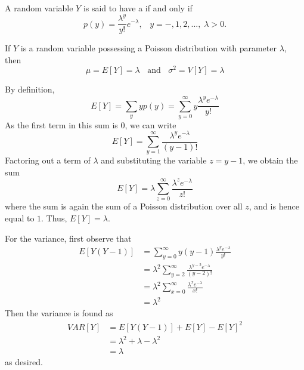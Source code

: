 \documentclass[12pt, a4paper, twoside, openright, titlepage]{book}
\begin{document}
\begin{defn}{}{}
    A random variable $Y$ is said to have a  if and only if \begin{equation*}
        p(y) = \frac{\lambda^y}{y!}e^{-\lambda},\;\;\; y = -,1,2,...,\;\lambda > 0.
    \end{equation*}
\end{defn}


\begin{thm}{}{}
    If $Y$ is a random variable possessing a Poisson distribution with parameter $\lambda$, then \begin{equation*}
        \mu = E[Y] = \lambda\;\;\text{ and }\;\;\sigma^2 = V[Y] = \lambda
    \end{equation*}
\end{thm}
\begin{proof*}{}{}
    By definition, \begin{equation*}
        E[Y] = \sum_yyp(y) = \sum\limits_{y=0}^{\infty}y\frac{\lambda^ye^{-\lambda}}{y!}
    \end{equation*}
    As the first term in this sum is $0$, we can write \begin{equation*}
        E[Y] = \sum\limits_{y=1}^{\infty}\frac{\lambda^ye^{-\lambda}}{(y-1)!}
    \end{equation*}
    Factoring out a term of $\lambda$ and substituting the variable $z = y-1$, we obtain the sum \begin{equation*}
        E[Y] = \lambda\sum\limits_{z=0}^{\infty}\frac{\lambda^ze^{-\lambda}}{z!}
    \end{equation*}
    where the sum is again the sum of a Poisson distribution over all $z$, and is hence equal to $1$. Thus, $E[Y] = \lambda$.

    For the variance, first observe that \begin{align*}
        E[Y(Y-1)] &= \sum\limits_{y=0}^{\infty}y(y-1)\frac{\lambda^ye^{-\lambda}}{y!} \\
        &= \lambda^2\sum\limits_{y=2}^{\infty}\frac{\lambda^{y-2}e^{-\lambda}}{(y-2)!} \\
        &= \lambda^2\sum\limits_{x=0}^{\infty}\frac{\lambda^xe^{-\lambda}}{x!} \\
        &= \lambda^2
    \end{align*}
    Then the variance is found as \begin{align*}
        VAR[Y] &= E[Y(Y-1)] + E[Y] - E[Y]^2 \\
        &= \lambda^2+\lambda-\lambda^2 \\
        &= \lambda
    \end{align*}
    as desired.
\end{proof*}
\end{document}
